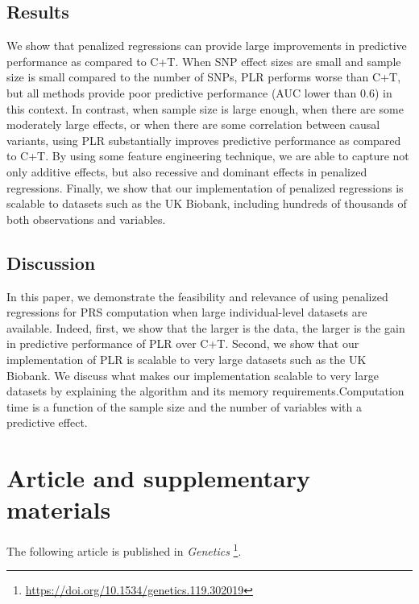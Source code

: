 \subsection{Results}

We show that penalized regressions can provide large improvements in predictive performance as compared to C+T. When SNP effect sizes are small and sample size is small compared to the number of SNPs, PLR performs worse than C+T, but all methods provide poor predictive performance (AUC lower than 0.6) in this context.
In contrast, when sample size is large enough, when there are some moderately large effects, or when there are some correlation between causal variants, using PLR substantially improves predictive performance as compared to C+T.
By using some feature engineering technique, we are able to capture not only additive effects, but also recessive and dominant effects in penalized regressions.
Finally, we show that our implementation of penalized regressions is scalable to datasets such as the UK Biobank, including hundreds of thousands of both observations and variables.

\subsection{Discussion}

In this paper, we demonstrate the feasibility and relevance of using penalized regressions for PRS computation when large individual-level datasets are available. Indeed, first, we show that the larger is the data, the larger is the gain in predictive performance of PLR over C+T. Second, we show that our implementation of PLR is scalable to very large datasets such as the UK Biobank.
We discuss what makes our implementation scalable to very large datasets by explaining the algorithm and its memory requirements.Computation time is a function of the sample size and the number of variables with a predictive effect.


\section{Article and supplementary materials}

The following article is published in \textit{Genetics}	\footnote{\url{https://doi.org/10.1534/genetics.119.302019}}.



